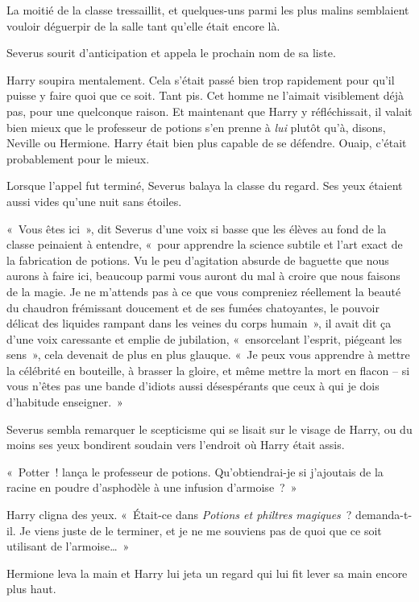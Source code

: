 La moitié de la classe tressaillit, et quelques-uns parmi les plus malins semblaient vouloir déguerpir de la salle tant qu'elle était encore là.

Severus sourit d'anticipation et appela le prochain nom de sa liste.

Harry soupira mentalement.
Cela s'était passé bien trop rapidement pour qu'il puisse y faire quoi que ce soit.
Tant pis.
Cet homme ne l'aimait visiblement déjà pas, pour une quelconque raison.
Et maintenant que Harry y réfléchissait, il valait bien mieux que le professeur de potions s'en prenne à \emph{lui} plutôt qu'à, disons, Neville ou Hermione.
Harry était bien plus capable de se défendre.
Ouaip, c'était probablement pour le mieux.

Lorsque l'appel fut terminé, Severus balaya la classe du regard.
Ses yeux étaient aussi vides qu'une nuit sans étoiles.

«~Vous êtes ici~», dit Severus d'une voix si basse que les élèves au fond de la classe peinaient à entendre, «~pour apprendre la science subtile et l'art exact de la fabrication de potions.
Vu le peu d'agitation absurde de baguette que nous aurons à faire ici, beaucoup parmi vous auront du mal à croire que nous faisons de la magie.
Je ne m'attends pas à ce que vous compreniez réellement la beauté du chaudron frémissant doucement et de ses fumées chatoyantes, le pouvoir délicat des liquides rampant dans les veines du corps humain~», il avait dit ça d'une voix caressante et emplie de jubilation, «~ensorcelant l'esprit, piégeant les sens~», cela devenait de plus en plus glauque.
«~Je peux vous apprendre à mettre la célébrité en bouteille, à brasser la gloire, et même mettre la mort en flacon -- si vous n'êtes pas une bande d'idiots aussi désespérants que ceux à qui je dois d'habitude enseigner.~»

Severus sembla remarquer le scepticisme qui se lisait sur le visage de Harry, ou du moins ses yeux bondirent soudain vers l'endroit où Harry était assis.

«~Potter~! lança le professeur de potions.
Qu'obtiendrai-je si j'ajoutais de la racine en poudre d'asphodèle à une infusion d'armoise~?~»

Harry cligna des yeux.
«~Était-ce dans \emph{Potions et philtres magiques}~? demanda-t-il.
Je viens juste de le terminer, et je ne me souviens pas de quoi que ce soit utilisant de l'armoise…~»

Hermione leva la main et Harry lui jeta un regard qui lui fit lever sa main encore plus haut.

